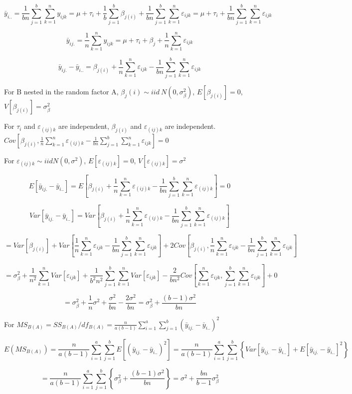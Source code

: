 \documentclass[12pt,]{article}
\begin{document}
\[\bar y_{i..}=\frac1{bn}\sum_{j=1}^b\sum_{k=1}^ny_{ijk}=\mu+\tau_{i}+\frac1b \sum_{j=1}^b\beta_{j(i)}+\frac1{bn}\sum_{j=1}^b\sum_{k=1}^n\varepsilon_{ijk}=\mu+\tau_{i}+\frac1{bn}\sum_{j=1}^b\sum_{k=1}^n\varepsilon_{ijk}\]

\[\bar y_{ij.}=\frac1{n}\sum_{k=1}^ny_{ijk}=\mu+\tau_{i}+\beta_j+\frac1{n}\sum_{k=1}^n\varepsilon_{ijk}\]

\[\bar y_{ij.}-\bar y_{i..}=\beta_{j(i)}+\frac1{n}\sum_{k=1}^n\varepsilon_{ijk}-\frac1{bn}\sum_{j=1}^b\sum_{k=1}^n\varepsilon_{ijk}\]

For B nested in the random factor A,
\(\beta_j(i)\sim iid\ N(0,\sigma_\beta^2)\), \(E[\beta_{j(i)}]=0\),
\(V[\beta_{j(i)}]=\sigma_\beta^2\)

For \(\tau_{i}\) and \(\varepsilon_{(ij)k}\) are independent,
\(\beta_{j(i)}\) and \(\varepsilon_{(ij)k}\) are independent.
\(Cov[\beta_{j(i)},\frac1{n}\sum_{k=1}^n\varepsilon_{(ij)k}-\frac1{bn}\sum_{j=1}^b\sum_{k=1}^n\varepsilon_{ijk}]=0\)

For \(\varepsilon_{(ij)k}\sim iid N(0,\sigma^2)\),
\(E[\varepsilon_{(ij)k}]=0\), \(V[\varepsilon_{(ij)k}]=\sigma^2\)

\[E[\bar y_{ij.}-\bar y_{i..}]=E[\beta_{j(i)}+\frac1{n}\sum_{k=1}^n\varepsilon_{(ij)k}-\frac1{bn}\sum_{j=1}^b\sum_{k=1}^n\varepsilon_{(ij)k}]=0\]

\[Var[\bar y_{ij.}-\bar y_{i..}]=Var[\beta_{j(i)}+\frac1{n}\sum_{k=1}^n\varepsilon_{(ij)k}-\frac1{bn}\sum_{j=1}^b\sum_{k=1}^n\varepsilon_{(ij)k}]\]

\[=Var[\beta_{j(i)}]+Var[\frac1{n}\sum_{k=1}^n\varepsilon_{ijk}-\frac1{bn}\sum_{j=1}^b\sum_{k=1}^n\varepsilon_{ijk}]+2Cov[\beta_{j(i)},\frac1{n}\sum_{k=1}^n\varepsilon_{ijk}-\frac1{bn}\sum_{j=1}^b\sum_{k=1}^n\varepsilon_{ijk}]\]

\[=\sigma_\beta^2+\frac1{n^2}\sum_{k=1}^nVar[\varepsilon_{ijk}]+\frac{1}{b^2n^2}\sum_{j=1}^b\sum_{k=1}^nVar[\varepsilon_{ijk}]-\frac{2}{bn^2}Cov[\sum_{k=1}^n\varepsilon_{ijk},\sum_{j=1}^b\sum_{k=1}^n\varepsilon_{ijk}]+0\]

\[=\sigma_\beta^2+\frac1n\sigma^2+\frac{\sigma^2}{bn}-\frac{2\sigma^2}{bn}=\sigma_\beta^2+\frac{(b-1)\sigma^2}{bn}\]

For
\(MS_{B(A)}=SS_{B(A)}/df_{B(A)}=\frac{n}{a(b-1)}\sum_{i=1}^a\sum_{j=1}^b(\bar y_{ij.}-\bar y_{i..})^2\)

\[E(MS_{B(A)})=\frac{n}{a(b-1)}\sum_{i=1}^a\sum_{j=1}^bE[(\bar y_{ij.}-\bar y_{i..})^2]=\frac{n}{a(b-1)}\sum_{i=1}^a\sum_{j=1}^b\left\{Var[\bar y_{ij.}-\bar y_{i..}]+E[\bar y_{ij.}-\bar y_{i..}]^2\right\}\]

\[=\frac{n}{a(b-1)}\sum_{i=1}^a\sum_{j=1}^b\left\{\sigma_\beta^2+\frac{(b-1)\sigma^2}{bn}\right\}=\sigma^2+\frac{bn}{b-1}\sigma_\beta^2\]
\end{document}
